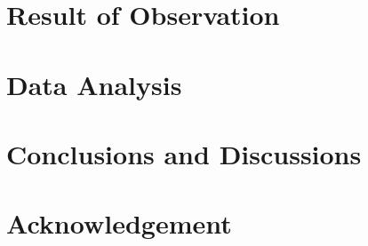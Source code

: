 \documentclass[review]{elsarticle}
\begin{document}
\section{Result of Observation}


\section{Data Analysis}


\section{Conclusions and Discussions}


\section{Acknowledgement}

\end{document}
